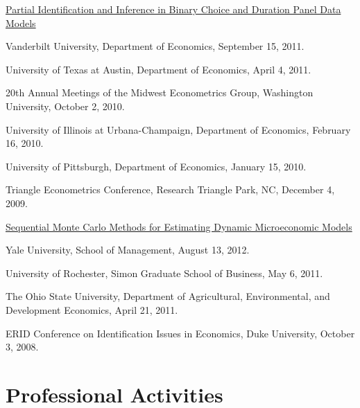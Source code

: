 \documentclass[10pt,letterpaper]{article}
\renewenvironment{itemize}{
  \begin{list}{}{
    \setlength{\leftmargin}{1.5em}
    \setlength{\itemsep}{0.25em}
    \setlength{\parskip}{0pt}
    \setlength{\parsep}{0.25em}
  }
}{
  \end{list}
}
\begin{document}
\begin{itemize}
\item \href{http://jblevins.org/research/panel}{Partial Identification and Inference in Binary Choice and Duration
    Panel Data Models}

  \begin{itemize}
  \item Vanderbilt University, Department of Economics,
    September 15, 2011.
  \item University of Texas at Austin, Department of Economics,
    April 4, 2011.
  \item 20th Annual Meetings of the Midwest Econometrics Group,
    Washington University,
    October 2, 2010.
  \item University of Illinois at Urbana-Champaign, Department of Economics,
    February 16, 2010.
  \item University of Pittsburgh, Department of Economics,
    January 15, 2010.
  \item Triangle Econometrics Conference,
    Research Triangle Park, NC,
    December 4, 2009.
  \end{itemize}

\item \href{http://jblevins.org/research/smcdmm}{Sequential Monte Carlo Methods for Estimating Dynamic Microeconomic Models}

  \begin{itemize}
  \item Yale University, School of Management,
    August 13, 2012.
  \item University of Rochester, Simon Graduate School of Business,
    May 6, 2011.
  \item The Ohio State University,
    Department of Agricultural, Environmental, and Development Economics,
    April 21, 2011.
  \item ERID Conference on Identification Issues in Economics,
    Duke University, October 3, 2008.
  \end{itemize}

\end{itemize}

\section*{Professional Activities}
\end{document}
